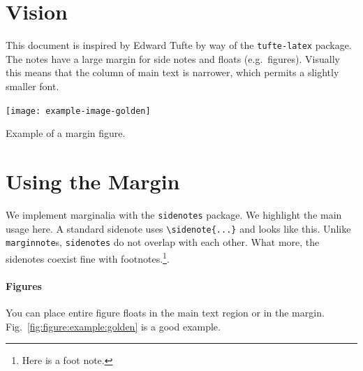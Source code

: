 \documentclass[12pt, oneside]{report}    %
\begin{document}
\section{Vision}

This document is inspired by Edward Tufte by way of the \texttt{tufte-latex} package. The notes have a large margin for side notes and floats (e.g.\ figures).  Visually this means that the column of main text is narrower, which permits a slightly smaller font.\begin{marginfigure}%
    \texttt{[image: example-image-golden]}
    \caption{Example of a margin figure.}
    \label{fig:figure:example:golden}
\end{marginfigure}


\section{Using the Margin}

We implement marginalia with the \texttt{sidenotes} package. We highlight the main usage here. A standard sidenote uses \verb!\sidenote{...}! and looks like this. Unlike \verb!marginnote!s, \verb!sidenotes! do not overlap with each other. What more, the sidenotes coexist fine with footnotes.\footnote{Here is a foot note.}.

\paragraph{Figures} You can place entire figure floats in the main text region or in the margin. Fig.~\ref{fig:figure:example:golden} is a good example.
\end{document}
